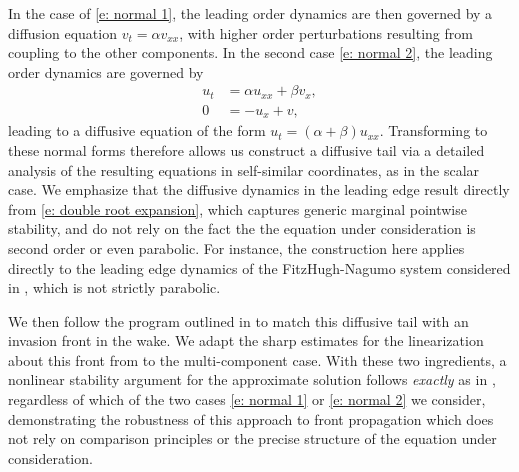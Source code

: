 \documentclass[11pt]{article}
\numberwithin{equation}{section}
\numberwithin{prop}{section}
\begin{document}
In the case of \eqref{e: normal 1}, the leading order dynamics are then governed by a diffusion equation $v_t = \alpha v_{xx}$, with higher order perturbations resulting from coupling to the other components. In the second case \eqref{e: normal 2}, the leading order dynamics are governed by
\begin{align}
	u_t &= \alpha u_{xx} + \beta v_x, \\
	0 &= - u_x + v, 
\end{align}
leading to a diffusive equation of the form $u_t = (\alpha + \beta) u_{xx}$. Transforming to these normal forms therefore allows us construct a diffusive tail via a detailed analysis of the resulting equations in self-similar coordinates, as in the scalar case. We emphasize that the diffusive dynamics in the leading edge result directly from \eqref{e: double root expansion}, which captures generic marginal pointwise stability, and do not rely on the fact the the equation under consideration is second order or even parabolic. For instance, the construction here applies directly to the leading edge dynamics of the FitzHugh-Nagumo system considered in \cite{cartersch}, which is not strictly parabolic. 

We then follow the program outlined in \cite{CAMS} to match this diffusive tail with an invasion front in the wake. We adapt the sharp estimates for the linearization about this front from \cite{SIMA} to the multi-component case. With these two ingredients, a nonlinear stability argument for the approximate solution follows \emph{exactly} as in \cite{CAMS}, regardless of which of the two cases \eqref{e: normal 1} or \eqref{e: normal 2} we consider, demonstrating the robustness of this approach to front propagation which does not rely on comparison principles or the precise structure of the equation under consideration. 
\end{document}
